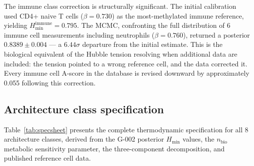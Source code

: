 \documentclass[12pt,a4paper]{article}
\newcommand{\Hmin}{H_{\min}}
\newcommand{\nbio}{n_{\mathrm{bio}}}
\begin{document}
The immune class correction is structurally significant. The initial calibration
used CD4+ naive T cells ($\beta = 0.730$) as the most-methylated immune reference,
yielding $\Hmin^{\mathrm{immune}} = 0.795$. The MCMC, confronting the full
distribution of 6 immune cell measurements including neutrophils ($\beta = 0.760$),
returned a posterior $0.8389 \pm 0.004$ --- a $6.44\sigma$ departure from the
initial estimate. This is the biological equivalent of the Hubble tension
resolving when additional data are included: the tension pointed to a wrong
reference cell, and the data corrected it. Every immune cell A-score in the
database is revised downward by approximately 0.055 following this correction.

\subsection{Architecture class specification}
\label{sec:specsheets}

Table~\ref{tab:specsheet} presents the complete thermodynamic specification
for all 8 architecture classes, derived from the G-002 posterior $\Hmin$
values, the $\nbio$ metabolic sensitivity parameter, the three-component
decomposition, and published reference cell data.
\end{document}
